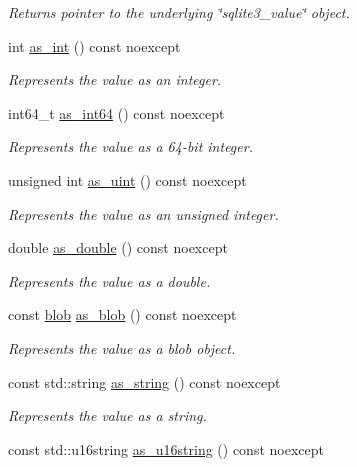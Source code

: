 \begin{DoxyCompactItemize}
\begin{DoxyCompactList}\small\item\em Returns pointer to the underlying \char`\"{}sqlite3\-\_\-value\char`\"{} object. \end{DoxyCompactList}\item 
int \hyperlink{a00015_a29efc5beb5d3a1fcf2f7baa59e810bf6}{as\-\_\-int} () const noexcept
\begin{DoxyCompactList}\small\item\em Represents the value as an integer. \end{DoxyCompactList}\item 
int64\-\_\-t \hyperlink{a00015_afb843fda2733a3a107b86557d74ca60e}{as\-\_\-int64} () const noexcept
\begin{DoxyCompactList}\small\item\em Represents the value as a 64-\/bit integer. \end{DoxyCompactList}\item 
unsigned int \hyperlink{a00015_ace86134f202dd8998645dd1f86dcf046}{as\-\_\-uint} () const noexcept
\begin{DoxyCompactList}\small\item\em Represents the value as an unsigned integer. \end{DoxyCompactList}\item 
double \hyperlink{a00015_aa86e87cfd02eec52a5f85b6787a5fd66}{as\-\_\-double} () const noexcept
\begin{DoxyCompactList}\small\item\em Represents the value as a double. \end{DoxyCompactList}\item 
const \hyperlink{a00002}{blob} \hyperlink{a00015_a623f5aeec955a49d4ca453658d4c45c5}{as\-\_\-blob} () const noexcept
\begin{DoxyCompactList}\small\item\em Represents the value as a blob object. \end{DoxyCompactList}\item 
const std\-::string \hyperlink{a00015_a6ce81cd7d007013cdc4ac5103ffa76f1}{as\-\_\-string} () const noexcept
\begin{DoxyCompactList}\small\item\em Represents the value as a string. \end{DoxyCompactList}\item 
const std\-::u16string \hyperlink{a00015_a6edf39b8900fa6b490161994da913236}{as\-\_\-u16string} () const noexcept

\end{DoxyCompactItemize}
